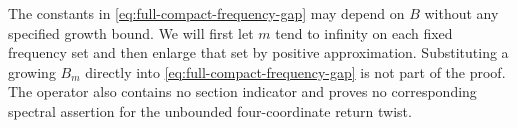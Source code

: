 \begin{remark}
The constants in \eqref{eq:full-compact-frequency-gap} may depend on
$B$ without any specified growth bound. We will first let $m$ tend to
infinity on each fixed frequency set and then enlarge that set by
positive approximation. Substituting a growing $B_m$ directly into
\eqref{eq:full-compact-frequency-gap} is not part of the proof. The
operator also contains no section indicator and proves no corresponding
spectral assertion for the unbounded four-coordinate return twist.
\end{remark}
